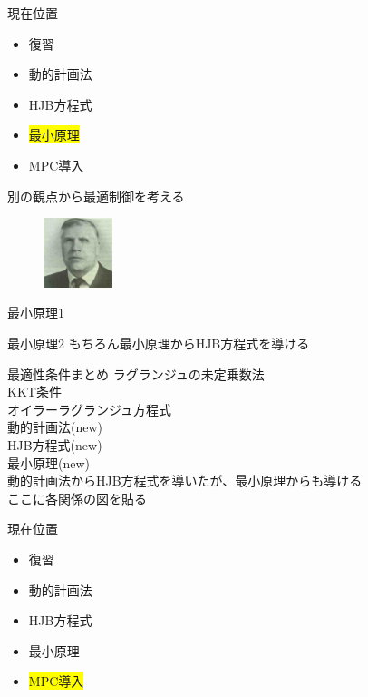 \documentclass[dvipdfmx,12pt]{beamer}
\begin{document}
    \begin{frame}{現在位置}
        \footnotesize
        \begin{itemize}
            \item 復習
            \item 動的計画法
            \item HJB方程式
            \item \colorbox{yellow}{最小原理}
            \item MPC導入
        \end{itemize}
        別の観点から最適制御を考える \\
        \begin{figure}[H]
            \includegraphics[clip, width = 2.0cm]{Pontryagin.png}
        \end{figure}
        \tiny{
        }
    \end{frame}

    \begin{frame}{最小原理1}
        \footnotesize

    \end{frame}

    \begin{frame}{最小原理2}
        \footnotesize
        もちろん最小原理からHJB方程式を導ける

    \end{frame}

    \begin{frame}{最適性条件まとめ}
        \footnotesize
        ラグランジュの未定乗数法\\
        KKT条件\\
        オイラーラグランジュ方程式\\
        動的計画法(new)\\
        HJB方程式(new)\\
        最小原理(new)\\
        動的計画法からHJB方程式を導いたが、最小原理からも導ける\\

        ここに各関係の図を貼る
    \end{frame}
    \begin{frame}{現在位置}
        \footnotesize
        \begin{itemize}
            \item 復習
            \item 動的計画法
            \item HJB方程式
            \item 最小原理
            \item \colorbox{yellow}{MPC導入}
        \end{itemize}
    \end{frame}
\end{document}
